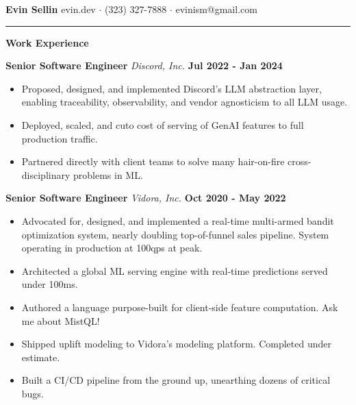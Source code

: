 \documentclass[10pt]{letter}
\begin{document}
\textbf{Evin Sellin}
\hfill
evin.dev $\cdot$ (323) 327-7888 $\cdot$ evinism@gmail.com
\vspace{4px}
\hrule
\textbf{Work Experience}

\hspace*{2px}
\textbf{Senior Software Engineer}
\textit{Discord, Inc.}
\hfill 
\textbf{Jul 2022 - Jan 2024}
\begin{itemize}
  \item Proposed, designed, and implemented Discord's LLM abstraction layer, enabling traceability, observability, and vendor agnosticism to all LLM usage.
  \item Deployed, scaled, and cuto cost of serving of GenAI features to full production traffic.
  \item Partnered directly with client teams to solve many hair-on-fire cross-disciplinary problems in ML.
\end{itemize}

\hspace*{2px}
\textbf{Senior Software Engineer} 
\textit{Vidora, Inc.}
\hfill 
\textbf{Oct 2020 - May 2022}
\begin{itemize}
  \item Advocated for, designed, and implemented a real-time multi-armed bandit optimization system, nearly doubling top-of-funnel sales pipeline. System operating in production at 100qps at peak.
  \item Architected a global ML serving engine with real-time predictions served under 100ms.
  \item Authored a language purpose-built for client-side feature computation. Ask me about MistQL!
  \item Shipped uplift modeling to Vidora's modeling platform. Completed under estimate.
  \item Built a CI/CD pipeline from the ground up, unearthing dozens of critical bugs.
\end{itemize}
\end{document}
